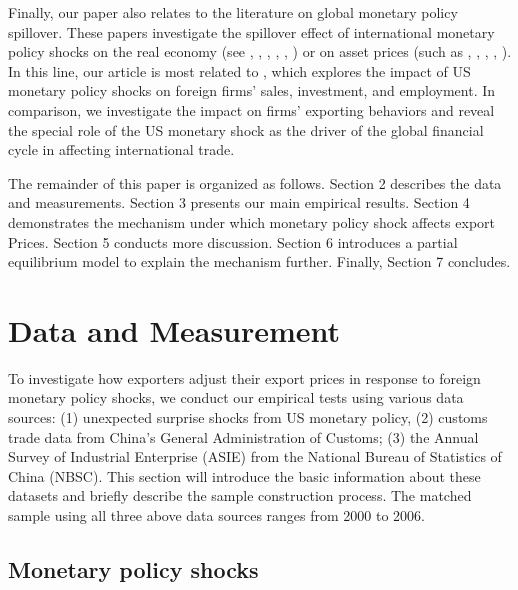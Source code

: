 Finally, our paper also relates to the literature on global monetary policy spillover. These papers investigate the spillover effect of international monetary policy shocks on the real economy (see \cite{kim2001international}, \cite{faust2003monetary}, \cite{faust2003identifying}, \cite{mackowiak2007external}, \cite{di2008impact}, \cite{bluedorn2011open}) or on asset prices (such as \cite{craine2008international}, \cite{wongswan2009response}, \cite{hausman2011global}, \cite{rogers2014evaluating}, \cite{miranda2020us}). In this line, our article is most related to \cite{di2023impact}, which explores the impact of US monetary policy shocks on foreign firms’ sales, investment, and employment. In comparison, we investigate the impact on firms' exporting behaviors and reveal the special role of the US monetary shock as the driver of the global financial cycle in affecting international trade.

The remainder of this paper is organized as follows. Section 2 describes the data and measurements. Section 3 presents our main empirical results. Section 4 demonstrates the mechanism under which monetary policy shock affects export Prices. Section 5 conducts more discussion. Section 6 introduces a partial equilibrium model to explain the mechanism further.  Finally, Section 7 concludes.


\newpage
\section{Data and Measurement}

To investigate how exporters adjust their export prices in response to foreign monetary policy shocks, we conduct our empirical tests using various data sources: (1) unexpected surprise shocks from US monetary policy, (2) customs trade data from China’s General Administration of Customs; (3) the Annual Survey of Industrial Enterprise (ASIE) from the National Bureau of Statistics of China (NBSC). This section will introduce the basic information about these datasets and briefly describe the sample construction process. The matched sample using all three above data sources ranges from 2000 to 2006.

\subsection{Monetary policy shocks}

